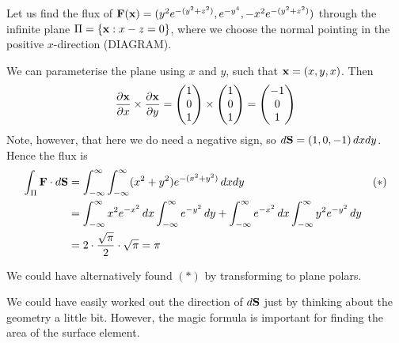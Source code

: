 \documentclass{../../template/note}
\begin{document}
    \begin{example*}
        Let us find the flux of \(\V F(\V x) = (y^2 e^{-(y^2+z^2)}, e^{-y^4}, -x^2e^{-(y^2+z^2)})\) through the infinite plane \(\Pi = \{\V x: x - z = 0\}\), where we choose the normal pointing in the positive \(x\)-direction (DIAGRAM).

        We can parameterise the plane using \(x\) and \(y\), such that \(\V x = (x, y, x)\). Then
        \begin{align*}
            \pd{\V x}{x} \times \pd{\V x}{y} = \begin{pmatrix}
             1 \\
             0 \\
             1 \\
            \end{pmatrix} \times \begin{pmatrix}
             1 \\
             0 \\
             1 \\
            \end{pmatrix} = \begin{pmatrix}
             -1 \\
             0 \\
             1 \\
            \end{pmatrix}
        \end{align*}
        Note, however, that here we do need a negative sign, so \(d\V S = (1, 0, -1) \D x dy\). Hence the flux is
        \begin{align*}
            \int_\Pi \V F \cdot d\V S &= \int_{-\infty}^\infty \int_{-\infty}^\infty (x^2+y^2) e^{-(x^2+y^2)} \D x dy && (*)\\
            &= \int_{-\infty}^\infty x^2 e^{-x^2} \D x \int_{-\infty}^\infty e^{-y^2} \D y + \int_{-\infty}^\infty e^{-x^2} \D x \int_{-\infty}^\infty y^2 e^{-y^2} \D y \\
            &= 2 \cdot \frac{\sqrt \pi}{2} \cdot \sqrt \pi = \pi
        \end{align*}
    \end{example*}
    
    \begin{remark*}
        We could have alternatively found \((*)\) by transforming to plane polars.
    \end{remark*}
    
    \begin{remark*}
        We could have easily worked out the direction of \(d\V S\) just by thinking about the geometry a little bit. However, the magic formula is important for finding the area of the surface element.
    \end{remark*}
    
\end{document}
